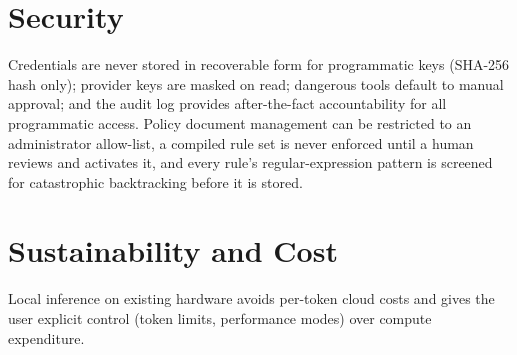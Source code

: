 \documentclass[12pt,a4paper,oneside]{report}
\begin{document}
\section{Security}
Credentials are never stored in recoverable form for programmatic
keys (SHA-256 hash only); provider keys are masked on read; dangerous
tools default to manual approval; and the audit log provides
after-the-fact accountability for all programmatic access. Policy
document management can be restricted to an administrator allow-list,
a compiled rule set is never enforced until a human reviews and
activates it, and every rule's regular-expression pattern is screened
for catastrophic backtracking before it is stored.

\section{Sustainability and Cost}
Local inference on existing hardware avoids per-token cloud costs and
gives the user explicit control (token limits, performance modes)
over compute expenditure.
\end{document}
